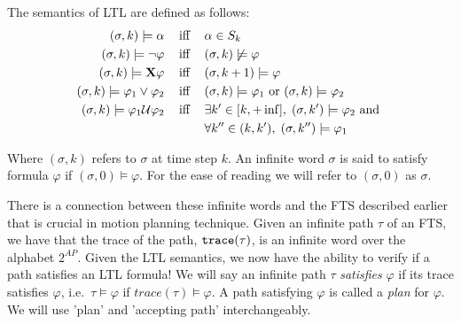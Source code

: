 \theoremstyle{definition}
\begin{definition}
\label{defLTLS}
The semantics of LTL are defined as follows:
\begin{align*}
(\sigma,k) \models \alpha \hspace{0.3cm}\text{ iff }\hspace{0.3cm}& \alpha \in S_k \\
(\sigma,k) \models \neg \varphi \hspace{0.3cm}\text{ iff }\hspace{0.3cm}& (\sigma, k) \not \models \varphi \\
(\sigma,k) \models \textbf{X} \varphi \hspace{0.3cm}\text{ iff }\hspace{0.3cm}& (\sigma, k+1) \models \varphi \\
(\sigma,k) \models \varphi_1 \lor \varphi_2 \hspace{0.3cm}\text{ iff }\hspace{0.3cm}& (\sigma,k) \models \varphi_1 \text{ or } (\sigma,k) \models \varphi_2 \\
(\sigma,k) \models \varphi_1 \mathcal{U} \varphi_2 \hspace{0.3cm}\text{ iff }\hspace{0.3cm}& \exists k' \in [k,+\inf ], \hspace{0.1cm} (\sigma ,k') \models \varphi_2 \text{ and } \\ &\forall k'' \in (k,k'), \hspace{0.1cm} (\sigma, k'') \models \varphi_1 
\end{align*}
\end{definition}
Where $(\sigma,k)$  refers to $\sigma$ at time step $k$. An infinite word $\sigma$ is said to satisfy formula $\varphi$ if $(\sigma,0) \models \varphi$. For the ease of reading we will refer to $(\sigma,0)$ as $\sigma$. 

There is a connection between these infinite words and the FTS described earlier that is crucial in motion planning technique. Given an infinite path $\tau$ of an FTS, we have that the trace of the path, $\texttt{trace}(\tau)$, is an infinite word over the alphabet $2^{AP}$. Given the LTL semantics, we now have the ability to verify if a path satisfies an LTL formula! We will say an infinite path $\tau$ \textit{satisfies} $\varphi$ if its trace satisfies $\varphi$, i.e.\ $\tau \models \varphi$ if $trace(\tau) \models \varphi$. A path satisfying $\varphi$ is called a \textit{plan} for $\varphi$. We will use 'plan' and 'accepting path' interchangeably.




